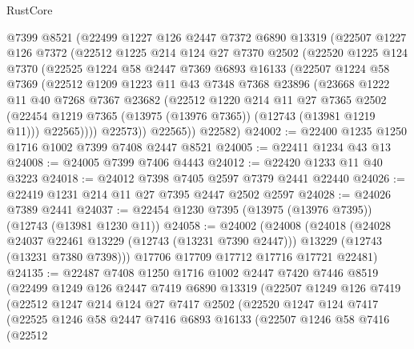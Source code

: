 \begin{lexlean}{RustCore}
\begin{coremodule}
    @7399
    @8521
    (@22499
      @1227
      @126
      @2447
      @7372
      @6890
      @13319
      (@22507
        @1227
        @126
        @7372
        (@22512
          @1225
          @214
          @124
          @27
          @7370
          @2502
          (@22520
            @1225
            @124
            @7370
            (@22525
              @1224
              @58
              @2447
              @7369
              @6893
              @16133
              (@22507
                @1224
                @58
                @7369
                (@22512
                  @1209
                  @1223
                  @11
                  @43
                  @7348
                  @7368
                  @23896
                  (@23668
                    @1222
                    @11
                    @40
                    @7268
                    @7367
                    @23682
                    (@22512
                      @1220
                      @214
                      @11
                      @27
                      @7365
                      @2502
                      (@22454 @1219 @7365 (@13975 (@13976 @7365)) (@12743 (@13981 @1219 @11)))
                      @22565))))
              @22573))
          @22565))
      @22582)
@24002 := @22400 @1235 @1250 @1716 @1002 @7399 @7408 @2447 @8521
@24005 := @22411 @1234 @43 @13
@24008 := @24005 @7399 @7406 @4443
@24012 := @22420 @1233 @11 @40 @3223
@24018 := @24012 @7398 @7405 @2597 @7379 @2441 @22440
@24026 := @22419 @1231 @214 @11 @27 @7395 @2447 @2502 @2597
@24028 := @24026 @7389 @2441
@24037 := @22454 @1230 @7395 (@13975 (@13976 @7395)) (@12743 (@13981 @1230 @11))
@24058 := @24002
    (@24008
      (@24018
        (@24028 @24037 @22461 @13229 (@12743 (@13231 @7390 @2447)))
        @13229
        (@12743 (@13231 @7380 @7398)))
      @17706
      @17709
      @17712
      @17716
      @17721
      @22481)
@24135 := @22487
    @7408
    @1250
    @1716
    @1002
    @2447
    @7420
    @7446
    @8519
    (@22499
      @1249
      @126
      @2447
      @7419
      @6890
      @13319
      (@22507
        @1249
        @126
        @7419
        (@22512
          @1247
          @214
          @124
          @27
          @7417
          @2502
          (@22520
            @1247
            @124
            @7417
            (@22525
              @1246
              @58
              @2447
              @7416
              @6893
              @16133
              (@22507
                @1246
                @58
                @7416
                (@22512

\end{coremodule}
\end{lexlean}
